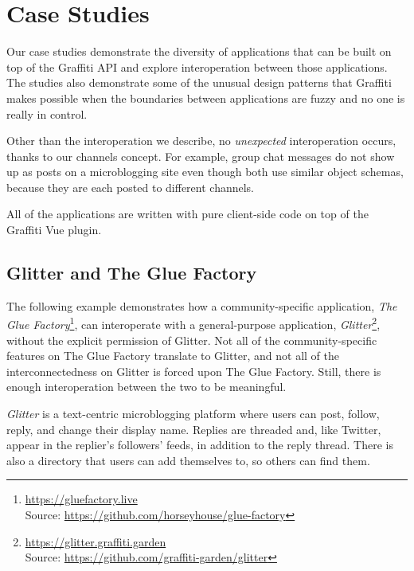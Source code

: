 \section{Case Studies}
\label{case-studies}

Our case studies demonstrate the diversity of applications
that can be built on top of the Graffiti API and explore interoperation
between those applications.
The studies also demonstrate some of the unusual design patterns that
Graffiti makes possible when the boundaries between applications
are fuzzy and no one is really in control.

Other than the interoperation we describe, no \emph{unexpected}
interoperation occurs, thanks to our channels concept.
For example, group chat messages do not show up as posts on
a microblogging site even though both use similar object schemas,
because they are each posted to different channels.

All of the applications are written with pure client-side code on
top of the Graffiti Vue plugin.

\subsection{Glitter and The Glue Factory}

The following example demonstrates how a community-specific application,
\emph{The Glue Factory}\footnote{
\url{https://gluefactory.live}\\Source: \url{https://github.com/horseyhouse/glue-factory}
}, can interoperate with a general-purpose application, \emph{Glitter}\footnote{
\url{https://glitter.graffiti.garden}\\Source: \url{https://github.com/graffiti-garden/glitter}
},
without the explicit permission of Glitter.
Not all of the community-specific features on The Glue Factory
translate to Glitter, and not all of the interconnectedness on Glitter
is forced upon The Glue Factory.
Still, there is enough interoperation between the two to be meaningful.

\emph{Glitter} is a text-centric microblogging platform
where users can post, follow, reply, and change their display name.
Replies are threaded and, like Twitter, appear in the replier's followers' feeds, in addition to the reply thread.
There is also a directory that users can add themselves to,
so others can find them.

